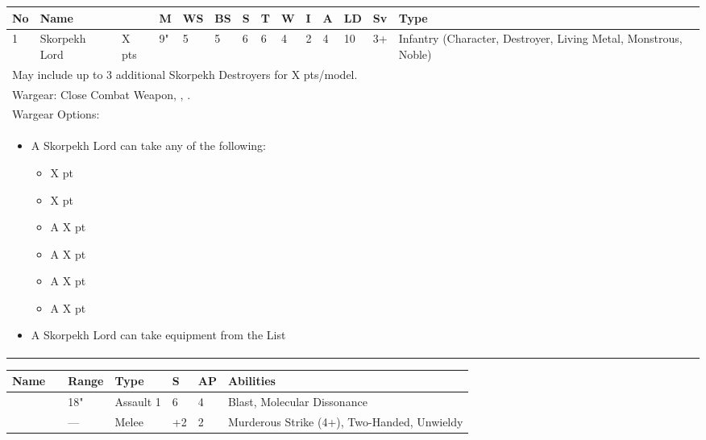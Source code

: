 \noindent
\begin{tabular}{||m{10pt} m{90pt} m{30pt} m{11pt} m{11pt} m{11pt} m{11pt} m{11pt} m{11pt} m{11pt} m{11pt} m{11pt} m{11pt} m{135pt}||}
	\hline
	No & Name & & M & WS & BS & S & T & W & I & A & LD & Sv & Type \\
	\hline
	1 & Skorpekh Lord & X pts & 9" & 5 & 5 & 6 & 6 & 4 & 2 & 4 & 10 & 3+ & Infantry (Character, Destroyer, Living Metal, Monstrous, Noble) \\
	\hline
	\hline
	\multicolumn{14}{||Z{532 pt}||}{May include up to 3 additional Skorpekh Destroyers for X pts/model.}\\	
	\hline
	\hline
	\multicolumn{14}{||Z{532 pt}||}{Wargear: Close Combat Weapon, \quickref{Enmitic Annihilator}, \quickref{Hyperphase Harvester}.} \\
	\multicolumn{14}{||Z{532 pt}||}{Wargear Options:} \\	\multicolumn{14}{||Z{532 pt}||}{\begin{itemize}
			\item A Skorpekh Lord can take any of the following:
			\begin{itemize}
				\item \quickref{Flensing Scarabs} \hrulefill X pt
				\item \quickref{Mindshackle Scarabs} \hrulefill X pt
				\item A \quickref{Phase Shifter} \hrulefill X pt
				\item A \quickref{Phylactery} \hrulefill X pt
				\item A \quickref{Sempiternal Weave} \hrulefill X pt
				\item A \quickref{Shadow Ankh} \hrulefill X pt
			\end{itemize}
			\item A Skorpekh Lord can take equipment from the \quickref{Artefacts of the Aeons} List
	\end{itemize}} \\
	\hline
\end{tabular}

\noindent
\begin{tabular}{||m{110pt} m{30pt} m{31pt} m{55pt} m{12pt} m{12pt} m{210pt}||}
	\hline
	Name & & Range & Type & S & AP & Abilities \\
	\hline
	\quickref{Enmitic Annihilator} &  & 18" & Assault 1 & 6 & 4 & Blast, Molecular Dissonance \\
	\quickref{Hyperphase Harvester} &  & — & Melee & +2 & 2 & Murderous Strike (4+), Two-Handed, Unwieldy \\
	\hline
\end{tabular}

